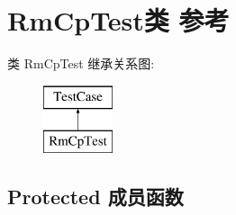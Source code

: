 \hypertarget{class_rm_cp_test}{}\section{Rm\+Cp\+Test类 参考}
\label{class_rm_cp_test}
类 Rm\+Cp\+Test 继承关系图\+:\begin{figure}[H]
\begin{center}
\leavevmode
\includegraphics[height=2.000000cm]{class_rm_cp_test}
\end{center}
\end{figure}
\subsection*{Protected 成员函数}
